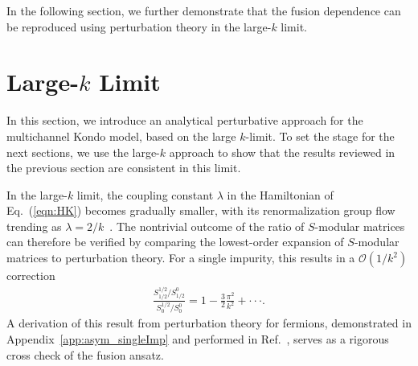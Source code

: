 \documentclass[aps,prb,twocolumn,superscriptaddress]{revtex4-1}
\begin{document}
In the following section, we further demonstrate that the fusion dependence can be reproduced using perturbation theory in the large-$k$ limit. 


\section{Large-$k$ Limit}
\label{se:largek}
In this section, we introduce an analytical perturbative approach for the multichannel Kondo model, based on the large $k$-limit. To set the stage for the next sections, we use the large-$k$ approach to show that the results reviewed in the previous section are consistent in this limit.


In the large-$k$ limit, the coupling constant $\lambda$ in the Hamiltonian of Eq.~(\ref{eqn:HK}) becomes gradually smaller, with its renormalization group flow trending as $\lambda=2/k$~\cite{nozieres1980kondo}. The nontrivial outcome of the ratio of $S$-modular matrices can therefore be verified by comparing the lowest-order expansion of $S$-modular matrices to perturbation theory. For a single impurity, this results in a $\mathcal{O}(1/k^{2})$ correction~\cite{affleck1993exact}
\begin{eqnarray}
	\frac{S_{1/2}^{1/2}/S_{1/2}^{0}}{S_{0}^{1/2}/S_{0}^{0}}=1-\frac{3}{2}\frac{\pi^{2}}{k^{2}}+\cdot\cdot\cdot. \label{eqn:fusion_exp}
\end{eqnarray}
A derivation of this result from perturbation theory for fermions, demonstrated in Appendix~\ref{app:asym_singleImp} and performed in Ref.~, serves as a rigorous cross check of the fusion ansatz. 
\end{document}

